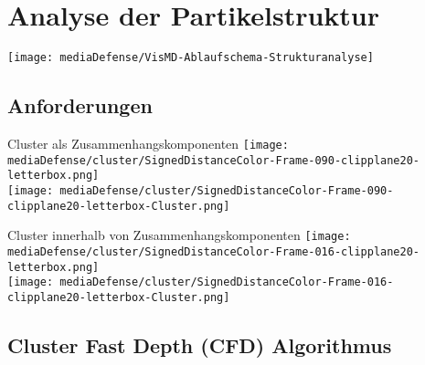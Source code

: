 \documentclass[10pt]{beamer}
\newcommand{\liquid}[1]{\textcolor{blau}{#1}}
\newcommand{\liquidcenter}[1]{\textcolor{blaurot}{#1}}
\newcommand{\wichtig}[1]{\textit{#1}}
\newcommand{\gas}[1]{\textcolor{orange}{#1}}
\begin{document}
\section{Analyse der Partikelstruktur}

\begin{wideframe}
	\texttt{[image: mediaDefense/VisMD-Ablaufschema-Strukturanalyse]}
\end{wideframe}

\subsection{Anforderungen}

\begin{frame}Cluster als Zusammenhangskomponenten
	\texttt{[image: mediaDefense/cluster/SignedDistanceColor-Frame-090-clipplane20-letterbox.png]}\\
	\texttt{[image: mediaDefense/cluster/SignedDistanceColor-Frame-090-clipplane20-letterbox-Cluster.png]}
\end{frame}

\begin{frame}Cluster innerhalb von Zusammenhangskomponenten
	\texttt{[image: mediaDefense/cluster/SignedDistanceColor-Frame-016-clipplane20-letterbox.png]}\\
	\texttt{[image: mediaDefense/cluster/SignedDistanceColor-Frame-016-clipplane20-letterbox-Cluster.png]}
\end{frame}

\subsection{Cluster Fast Depth (CFD) Algorithmus}
\end{document}
